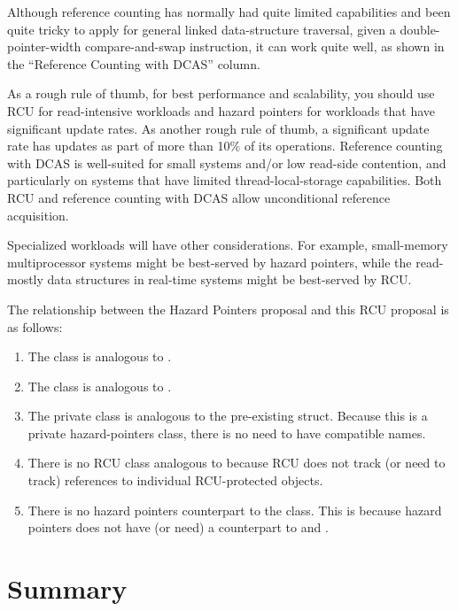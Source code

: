 \documentclass[letterpaper,10pt]{article}
\begin{document}
Although reference counting has normally had quite limited capabilities
and been quite tricky to apply for general linked data-structure
traversal, given a double-pointer-width compare-and-swap instruction,
it can work quite well, as shown in the ``Reference Counting with DCAS''
column.

As a rough rule of thumb, for best performance and scalability, you
should use RCU for read-intensive workloads and hazard pointers for
workloads that have significant update rates.
As another rough rule of thumb, a significant update rate has updates
as part of more than 10\% of its operations.
Reference counting with DCAS is well-suited for small systems and/or
low read-side contention, and particularly on systems that have limited
thread-local-storage capabilities.
Both RCU and reference counting with DCAS allow unconditional reference
acquisition.

Specialized workloads will have other considerations.
For example, small-memory multiprocessor systems might be best-served by
hazard pointers, while the read-mostly data structures in real-time
systems might be best-served by RCU.

The relationship between the Hazard Pointers proposal and this RCU
proposal is as follows:

\begin{enumerate}
\item	The  class is analogous to .
\item	The  class is analogous to .
\item	The private  class is analogous to the pre-existing
	 struct.
	Because this is a private hazard-pointers class, there is no
	need to have compatible names.
\item	There is no RCU class analogous to  because
	RCU does not track (or need to track) references to individual
	RCU-protected objects.
\item	There is no hazard pointers counterpart to the 
	class.
	This is because hazard pointers does not have (or need)
	a counterpart to  and .
\end{enumerate}

\section{Summary}
\label{sec:Summary}
\end{document}
